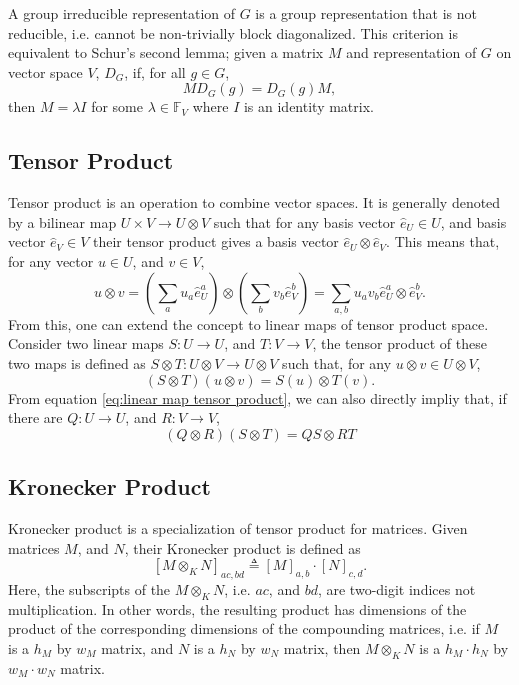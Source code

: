\documentclass[preprint, 12pt]{revtex4-2}
\numberwithin{equation}{section}
\begin{document}
A group irreducible representation of $G$ is a group representation that is not reducible, i.e. cannot be non-trivially block diagonalized. This criterion is equivalent to Schur's second lemma; given a matrix $M$ and representation of $G$ on vector space $V$, $D_G$, if, for all $g\in G$,
\begin{equation}\label{eq:Schur's second lemma}
    MD_G(g) = D_G(g)M,
\end{equation}
then $M=\lambda I$ for some $\lambda\in \mathbb{F}_V$ where $I$ is an identity matrix.

\subsection{Tensor Product}
Tensor product is an operation to combine vector spaces. It is generally denoted by a bilinear map $U\times V\rightarrow U\otimes V$ such that for any basis vector $\hat{e}_U\in U$, and basis vector $\hat{e}_V\in V$ their tensor product gives a basis vector $\hat{e}_U\otimes \hat{e}_V$. This means that, for any vector $u\in U$, and $v\in V$,
\begin{equation}\label{eq:vector tensor product}
    u\otimes v = \left(\sum_{a}u_a\hat{e}_U^a\right)\otimes\left(\sum_{b}v_b\hat{e}_V^b\right) = \sum_{a,b}u_av_b\hat{e}_U^a\otimes\hat{e}_V^b.
\end{equation}
From this, one can extend the concept to linear maps of tensor product space. Consider two linear maps $S:U\rightarrow U$, and $T:V\rightarrow V$, the tensor product of these two maps is defined as $S\otimes T:U\otimes V\rightarrow U\otimes V$ such that, for any $u\otimes v\in U\otimes V$,
\begin{equation}\label{eq:linear map tensor product}
    (S\otimes T)(u\otimes v) = S(u)\otimes T(v).
\end{equation}
From equation \ref{eq:linear map tensor product}, we can also directly impliy that, if there are $Q:U\rightarrow U$, and $R:V\rightarrow V$,
\begin{equation}\label{eq:compose linear map tensor product}
    (Q\otimes R)(S\otimes T) = QS\otimes RT
\end{equation}

\subsection{Kronecker Product}
Kronecker product is a specialization of tensor product for matrices. Given matrices $M$, and $N$, their Kronecker product is defined as
\begin{equation}\label{eq:Kronecker product}
    \left[M\otimes_KN\right]_{ac,bd} \triangleq \left[M\right]_{a,b}\cdot\left[N\right]_{c,d}.
\end{equation}
Here, the subscripts of the $M\otimes_KN$, i.e. $ac$, and $bd$, are two-digit indices not multiplication. In other words, the resulting product has dimensions of the product of the corresponding dimensions of the compounding matrices, i.e. if $M$ is a $h_M$ by $w_M$ matrix, and $N$ is a $h_N$ by $w_N$ matrix, then $M\otimes_KN$ is a $h_M\cdot h_N$ by $w_M\cdot w_N$ matrix.
\end{document}

